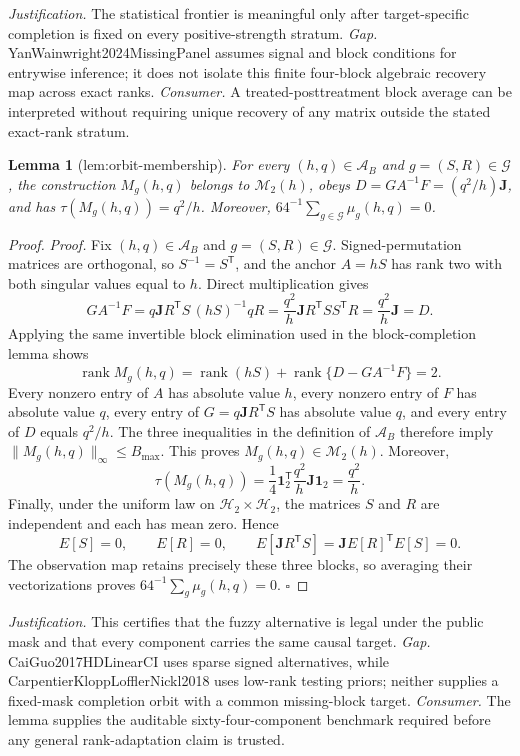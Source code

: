 \documentclass{article}
\newtheorem{lemma}{Lemma}
\begin{document}
\par\smallskip\noindent \textit{Justification.} The statistical frontier is meaningful only after target-specific completion is fixed on every positive-strength stratum. \textit{Gap.} YanWainwright2024MissingPanel assumes signal and block conditions for entrywise inference; it does not isolate this finite four-block algebraic recovery map across exact ranks. \textit{Consumer.} A treated-posttreatment block average can be interpreted without requiring unique recovery of any matrix outside the stated exact-rank stratum.

\begin{lemma}[lem:orbit-membership]\label{lem:orbit-membership}
For every \((h,q)\in\mathcal A_B\) and \(g=(S,R)\in\mathcal G\), the construction \(M_g(h,q)\) belongs to \(\mathcal M_2(h)\), obeys \(D=GA^{-1}F=(q^2/h)\mathbf J\), and has \(\tau(M_g(h,q))=q^2/h\). Moreover, \(64^{-1}\sum_{g\in\mathcal G}\mu_g(h,q)=0\).
\end{lemma}
\begin{proof}
\textit{Proof.}
Fix \((h,q)\in\mathcal A_B\) and \(g=(S,R)\in\mathcal G\).  Signed-permutation
matrices are orthogonal, so \(S^{-1}=S^{\mathsf T}\), and the anchor
\(A=hS\) has rank two with both singular values equal to \(h\).  Direct
multiplication gives
\[
GA^{-1}F
=q\mathbf J R^{\mathsf T}S\,(hS)^{-1}qR
=\frac{q^2}{h}\mathbf J R^{\mathsf T}SS^{\mathsf T}R
=\frac{q^2}{h}\mathbf J=D.
\]
Applying the same invertible block elimination used in the block-completion
lemma shows
\[
\operatorname{rank}M_g(h,q)
=\operatorname{rank}(hS)+
 \operatorname{rank}\{D-GA^{-1}F\}=2.
\]
Every nonzero entry of \(A\) has absolute value \(h\), every nonzero entry of
\(F\) has absolute value \(q\), every entry of
\(G=q\mathbf J R^{\mathsf T}S\) has absolute value \(q\), and every entry of
\(D\) equals \(q^2/h\).  The three inequalities in the definition of
\(\mathcal A_B\) therefore imply \(\lVert M_g(h,q)\rVert_\infty\leq B_{\max}\).
This proves \(M_g(h,q)\in\mathcal M_2(h)\).  Moreover,
\[
\tau(M_g(h,q))
=\frac14\mathbf 1_2^{\mathsf T}\frac{q^2}{h}\mathbf J\mathbf 1_2
=\frac{q^2}{h}.
\]
Finally, under the uniform law on
\(\mathcal H_2\times\mathcal H_2\), the matrices \(S\) and \(R\) are
independent and each has mean zero.  Hence
\[
E[S]=0,\qquad E[R]=0,\qquad
E[\mathbf J R^{\mathsf T}S]=\mathbf J E[R]^{\mathsf T}E[S]=0.
\]
The observation map retains precisely these three blocks, so averaging their
vectorizations proves \(64^{-1}\sum_g\mu_g(h,q)=0\). \(\square\)
\end{proof}
\par\smallskip\noindent \textit{Justification.} This certifies that the fuzzy alternative is legal under the public mask and that every component carries the same causal target. \textit{Gap.} CaiGuo2017HDLinearCI uses sparse signed alternatives, while CarpentierKloppLofflerNickl2018 uses low-rank testing priors; neither supplies a fixed-mask completion orbit with a common missing-block target. \textit{Consumer.} The lemma supplies the auditable sixty-four-component benchmark required before any general rank-adaptation claim is trusted.
\end{document}
